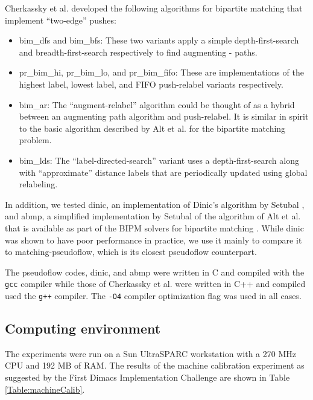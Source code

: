 \documentclass{article}
\begin{document}
Cherkassky et al. \cite{CheGMSS98} developed the following algorithms for bipartite matching that implement ``two-edge'' pushes:
\begin{itemize}
\item {\sf bim\_dfs} and {\sf bim\_bfs}: These two variants apply a simple depth-first-search and breadth-first-search respectively to find augmenting - paths.
\item {\sf pr\_bim\_hi}, {\sf pr\_bim\_lo}, and {\sf pr\_bim\_fifo}: These are implementations of the highest label, lowest label, and FIFO push-relabel variants respectively.
\item {\sf bim\_ar}: The ``augment-relabel'' algorithm could be thought of as a hybrid between an augmenting path algorithm and push-relabel. It is similar in spirit to the basic algorithm described by Alt et al. \cite{AltBMP91} for the bipartite matching problem.
\item {\sf bim\_lds}: The ``label-directed-search'' variant uses a depth-first-search along with ``approximate'' distance labels that are periodically updated using global relabeling.
\end{itemize}

In addition, we tested {\sf dinic}, an implementation of Dinic's algorithm by Setubal \cite{Set93}, and {\sf abmp}, a simplified implementation by Setubal \cite{Set96} of the algorithm of Alt et al.\cite{AltBMP91} that is available as part of the BIPM solvers for bipartite matching \cite{BIPM}.  While {\sf dinic} was shown to have poor performance in practice, we use it mainly to compare it to {\sf matching-pseudoflow}, which is its closest pseudoflow counterpart.

The pseudoflow codes, {\sf dinic}, and {\sf abmp} were written in C and compiled with the {\tt gcc} compiler while those of Cherkassky et al. \cite{CheGMSS98} were written in C++ and compiled used the {\tt g++} compiler.  The {\tt -O4} compiler optimization flag was used in all cases.

\subsection{Computing environment}

The experiments were run on a Sun UltraSPARC workstation with a 270 MHz CPU and 192 MB of RAM.  The results of the machine calibration experiment as suggested by the First Dimacs Implementation Challenge \cite{Dimacs90} are shown in Table \ref{Table:machineCalib}.
\end{document}
